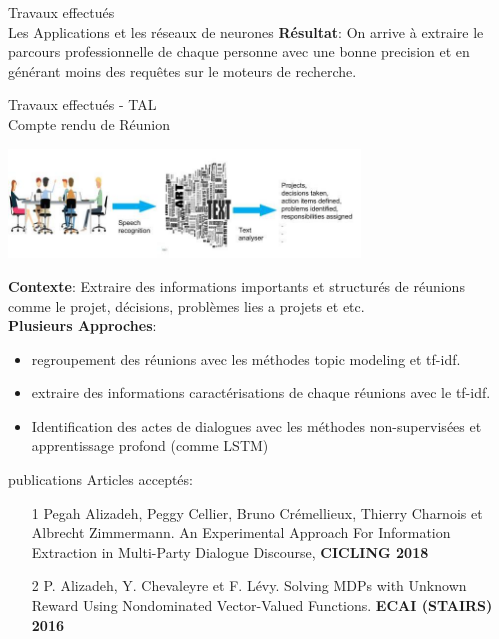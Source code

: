 \documentclass{beamer}
\begin{document}
{{\begin{frame}{Travaux effectués \\ Les Applications et les réseaux de neurones}
\textbf{Résultat}: On arrive à extraire le parcours professionnelle de chaque personne avec une bonne precision et en générant moins des requêtes sur le moteurs de recherche.  
\end{frame}
\begin{frame}{Travaux effectués - TAL \\ Compte rendu de Réunion}
\vspace{-0.5cm}
	\begin{center}
     \includegraphics[width=0.7\textwidth]{images/reus-image} \\
	\end{center}
%

\textbf{Contexte}: Extraire des informations importants et structurés de réunions comme le projet, décisions, problèmes lies a projets et etc. \\

\textbf{Plusieurs Approches}:
\begin{itemize}
	\item regroupement des réunions avec les méthodes topic modeling et tf-idf. 
	\item extraire des informations caractérisations de chaque réunions avec le tf-idf. 
	\item Identification des actes de dialogues avec les méthodes non-supervisées et apprentissage profond (comme LSTM)
\end{itemize}

\end{frame}

\begin{frame}{publications}
Articles acceptés:\\
\begin{itemize}

\item [1] Pegah Alizadeh, Peggy Cellier, Bruno Crémellieux, Thierry Charnois et Albrecht Zimmermann. An Experimental Approach For Information Extraction in Multi-Party Dialogue Discourse, \textbf{CICLING 2018}\\


\item [2] P. Alizadeh, Y. Chevaleyre et F. Lévy. Solving MDPs with Unknown Reward Using Nondominated Vector-Valued Functions. \textbf{ECAI (STAIRS) 2016}\\



\end{itemize}
\end{frame}}}
\end{document}
